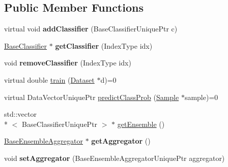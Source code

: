 \subsection*{Public Member Functions}
\begin{DoxyCompactItemize}
\item 
\hypertarget{classffactory_1_1_base_ensemble_classifier_afb635fc0bfe88a5100647c85afe373b3}{virtual void {\bfseries add\-Classifier} (Base\-Classifier\-Unique\-Ptr c)}\label{classffactory_1_1_base_ensemble_classifier_afb635fc0bfe88a5100647c85afe373b3}

\item 
\hypertarget{classffactory_1_1_base_ensemble_classifier_aea58a83aaec930aa021e67e704c251fc}{\hyperlink{classffactory_1_1_base_classifier}{Base\-Classifier} $\ast$ {\bfseries get\-Classifier} (Index\-Type idx)}\label{classffactory_1_1_base_ensemble_classifier_aea58a83aaec930aa021e67e704c251fc}

\item 
\hypertarget{classffactory_1_1_base_ensemble_classifier_ad026a89254a4c015efc0991015d85f01}{void {\bfseries remove\-Classifier} (Index\-Type idx)}\label{classffactory_1_1_base_ensemble_classifier_ad026a89254a4c015efc0991015d85f01}

\item 
virtual double \hyperlink{classffactory_1_1_base_ensemble_classifier_a6ea804da2a71766b49372cbddb12cd50}{train} (\hyperlink{classffactory_1_1_dataset}{Dataset} $\ast$d)=0
\item 
virtual Data\-Vector\-Unique\-Ptr \hyperlink{classffactory_1_1_base_ensemble_classifier_ac6da7b47a25c7c6481d6476891085d16}{predict\-Class\-Prob} (\hyperlink{classffactory_1_1_sample}{Sample} $\ast$sample)=0
\item 
std\-::vector\\*
$<$ Base\-Classifier\-Unique\-Ptr $>$ $\ast$ \hyperlink{classffactory_1_1_base_ensemble_classifier_a99dfac2d9fe4f6f380ded546070befb4}{get\-Ensemble} ()
\item 
\hypertarget{classffactory_1_1_base_ensemble_classifier_a9870bacad8acefb8014289bf99f82741}{\hyperlink{classffactory_1_1_base_ensemble_aggregator}{Base\-Ensemble\-Aggregator} $\ast$ {\bfseries get\-Aggregator} ()}\label{classffactory_1_1_base_ensemble_classifier_a9870bacad8acefb8014289bf99f82741}

\item 
\hypertarget{classffactory_1_1_base_ensemble_classifier_aa4a2fd1d18c05cbcc916657441bb63f1}{void {\bfseries set\-Aggregator} (Base\-Ensemble\-Aggregator\-Unique\-Ptr aggregator)}\label{classffactory_1_1_base_ensemble_classifier_aa4a2fd1d18c05cbcc916657441bb63f1}


\end{DoxyCompactItemize}
